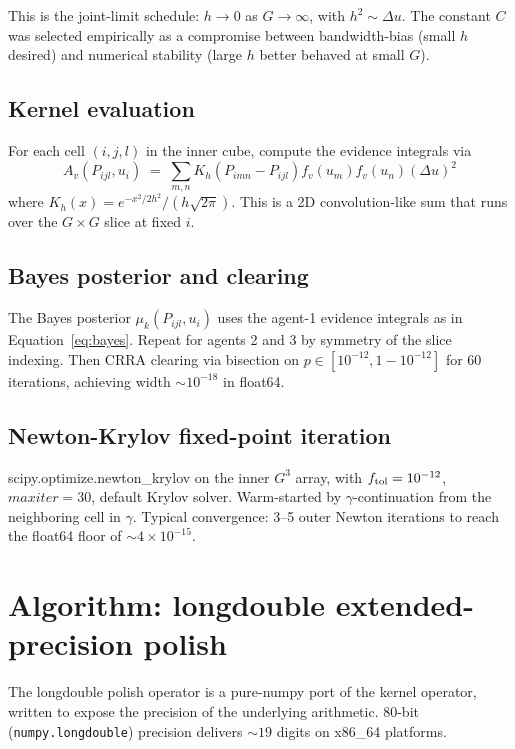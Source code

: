 \documentclass[11pt]{article}
\newcommand{\1}{\mathbf{1}}
\begin{document}
This is the joint-limit schedule: $h \to 0$ as $G \to \infty$, with
$h^2 \sim \Delta u$.  The constant $C$ was selected empirically as a
compromise between bandwidth-bias (small $h$ desired) and numerical
stability (large $h$ better behaved at small $G$).

\subsection{Kernel evaluation}

For each cell $(i, j, l)$ in the inner cube, compute the evidence
integrals via
\begin{equation}
A_v(P_{ijl}, u_i) \;=\; \sum_{m, n} K_h(P_{imn} - P_{ijl}) f_v(u_m) f_v(u_n) (\Delta u)^2
\end{equation}
where $K_h(x) = e^{-x^2/2h^2}/(h\sqrt{2\pi})$.  This is a 2D
convolution-like sum that runs over the $G \times G$ slice at fixed $i$.

\subsection{Bayes posterior and clearing}

The Bayes posterior $\mu_k(P_{ijl}, u_i)$ uses the agent-1 evidence
integrals as in Equation~\eqref{eq:bayes}.  Repeat for agents 2 and 3
by symmetry of the slice indexing.  Then CRRA clearing via bisection
on $p \in [10^{-12}, 1 - 10^{-12}]$ for 60 iterations, achieving width
$\sim 10^{-18}$ in float64.

\subsection{Newton-Krylov fixed-point iteration}

scipy.optimize.newton\_krylov on the inner $G^3$ array, with
$f_{\rm tol} = 10^{-12}$, $maxiter = 30$, default Krylov solver.
Warm-started by $\gamma$-continuation from the neighboring cell in
$\gamma$.  Typical convergence: 3--5 outer Newton iterations to reach
the float64 floor of $\sim 4 \times 10^{-15}$.

\section{Algorithm: longdouble extended-precision polish}
\label{app:ld}

The longdouble polish operator is a pure-numpy port of the kernel
operator, written to expose the precision of the underlying arithmetic.
80-bit (\texttt{numpy.longdouble}) precision delivers $\sim 19$ digits
on x86\_64 platforms.
\end{document}
